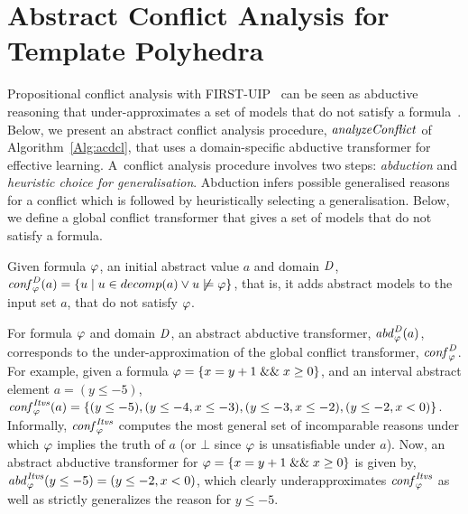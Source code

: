 \section{Abstract Conflict Analysis for Template Polyhedra}\label{sec:conflict}
%
Propositional conflict analysis with FIRST-UIP~\cite{cdcl} can be seen as
abductive reasoning that under-approximates a set of models that do not
satisfy a formula~\cite{sas12,dhk2013-popl}.  Below, we present an abstract
conflict analysis procedure, $\mathit{analyzeConflict}$ of
Algorithm~\ref{Alg:acdcl}, that uses a domain-specific abductive transformer
for effective learning.  A~conflict analysis procedure involves two steps:
{\em abduction} and {\em heuristic choice for generalisation}.  Abduction
infers possible generalised reasons for a conflict which is followed by
heuristically selecting a generalisation.  Below, we define a global 
conflict transformer that gives a set of models that do not satisfy a 
formula.  
\begin{definition}
  Given formula $\varphi$, an initial abstract value $a$ and domain 
  $\mathit{D}$, $\mathit{conf}_{\varphi}^{\mathit{D}}(a) = \{u \mid u \in decomp(a) 
  \vee u \not\models \varphi \}$, that is, it adds abstract models to 
  the input set $a$, that do not satisfy $\varphi$.
\end{definition}
%
For formula $\varphi$ and domain $\mathit{D}$, an abstract abductive transformer, 
$\mathit{abd}_{\varphi}^{\mathit{D}}(a)$, corresponds 
to the under-approximation of the global conflict transformer,
$\mathit{conf}_{\varphi}^{\mathit{D}}$.  
%
For example, given a formula $\varphi=\{x=y+1\; \&\&\; x\geq 0\}$, and an interval 
abstract element $a=(y\leq-5)$, $\mathit{conf}_{\varphi}^{\mathit{Itvs}}(a) = \{(y\leq-5), 
(y \leq -4, x \leq -3), (y \leq -3, x \leq -2), (y \leq -2, x < 0)\}$.
Informally, $\mathit{conf}_{\varphi}^{\mathit{Itvs}}$  computes the most general set of
incomparable reasons under which $\varphi$ implies the truth of $a$ (or $\bot$
since $\varphi$ is unsatisfiable under $a$). 
%
Now, an abstract abductive transformer for $\varphi=\{x=y+1\; \&\&\; x \geq 0\}$ 
is given by, $\mathit{abd}_{\varphi}^{\mathit{Itvs}}(y \leq -5)=(y \leq -2, x < 0)$,
which clearly underapproximates $\mathit{conf}_{\varphi}^{\mathit{Itvs}}$ as well as strictly
generalizes the reason for $y \leq -5$. 
%


